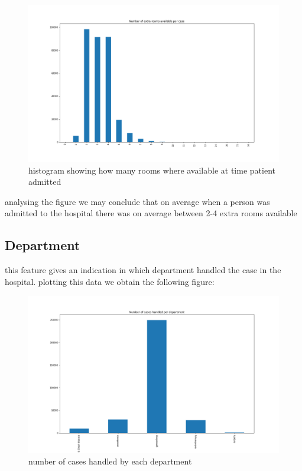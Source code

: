 \documentclass[fleqn]{article}
\begin{document}
			\begin{figure}[hb]
  				\includegraphics[width=\linewidth]{Extraroom_hist.png}
  				\caption{histogram showing how many rooms where available at time 						patient admitted}
  				\label{fig:5}
			\end{figure} 
			\FloatBarrier
			
			analysing the figure we may conclude that on average when a person was 					admitted to the hospital there was on average between 2-4 extra rooms 					available
			
		\subsection*{Department}
			this feature gives an indication in which department handled the case in 			the hospital. plotting this data we obtain the following figure:
			
			\begin{figure}[hb]
  				\includegraphics[width=\linewidth]{department_hist.png}
  				\caption{number of cases handled by each department}
  				\label{fig:6}
			\end{figure} 
			\FloatBarrier
			
\end{document}
